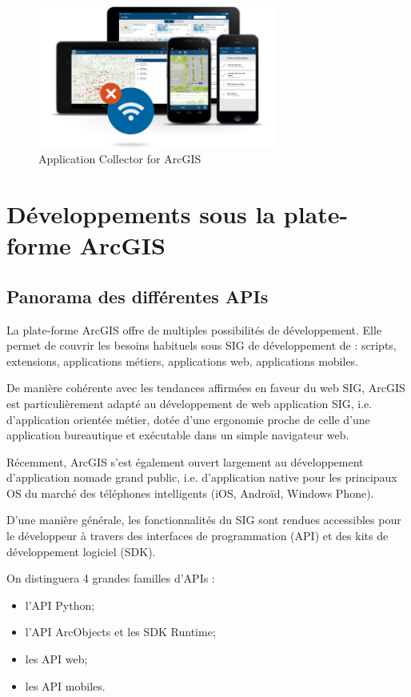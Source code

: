 \documentclass[11pt]{article}
\begin{document}
\begin{figure}[H]
	\center \includegraphics[width=0.70\textwidth]{img/cours/collector_for_arcgis.jpg}
	\caption{Application Collector for ArcGIS}
\end{figure}

\newpage



\section{Développements sous la plate-forme ArcGIS}

\subsection{Panorama des différentes APIs}
La plate-forme ArcGIS offre de multiples possibilités de développement. Elle permet de couvrir les besoins habituels sous SIG de développement de : scripts, extensions, applications métiers, applications web, applications mobiles.

De manière cohérente avec les tendances affirmées en faveur du web SIG, ArcGIS est particulièrement adapté au développement de web application SIG, i.e. d’application orientée métier, dotée d’une ergonomie proche de celle d’une application bureautique et exécutable dans un simple navigateur web.

Récemment, ArcGIS s’est également ouvert largement au développement d’application nomade grand public, i.e. d’application native pour les principaux OS du marché des téléphones intelligents (iOS, Androïd, Windows Phone).

D’une manière générale, les fonctionnalités du SIG sont rendues accessibles pour le développeur à travers des interfaces de programmation (API) et des kits de développement logiciel (SDK).

On distinguera 4 grandes familles d'APIs :
\begin{itemize}
	\item l'API Python;
	\item l'API ArcObjects et les SDK Runtime;
	\item les API web;
	\item les API mobiles.
\end{itemize}
\end{document}
